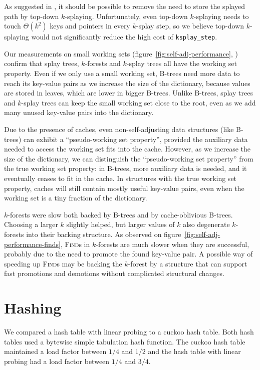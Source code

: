 As suggested in \cite{ksplay-sherk}, it should be possible to remove the
need to store the splayed path by top-down \mbox{$k$-splaying}.
Unfortunately, even top-down \mbox{$k$-splaying} needs to touch
$\Theta(k^2)$ keys and pointers in every $k$-splay step, so we believe top-down
\mbox{$k$-splaying} would not significantly reduce the high cost of
\texttt{ksplay\_step}.

Our measurements on small working sets
(figure~\ref{fig:self-adj-performance},
) confirm that splay trees, $k$-forests
and $k$-splay trees all have the working set property.
Even if we only use a small working set, B-trees need more data to reach
its key-value pairs as we increase the size of the dictionary, because values
are stored in leaves, which are lower in bigger B-trees.
Unlike B-trees, splay trees and $k$-splay trees can keep the small working set
close to the root, even as we add many unused key-value pairs into the
dictionary.

Due to the presence of caches, even non-self-adjusting data structures (like
\mbox{B-trees}) can exhibit a ``pseudo-working set property'', provided
the auxiliary data needed to access the working set fits into the cache.
However, as we increase the size of the dictionary, we can distinguish
the ``pseudo-working set property'' from the true working set property:
in B-trees, more auxiliary data is needed, and it eventually ceases to fit
in the cache.
In structures with the true working set property, caches will still contain
mostly useful key-value pairs, even when the working set is a tiny fraction
of the dictionary.

$k$-forests were slow both backed by B-trees and by cache-oblivious B-trees.
Choosing a larger $k$ slightly helped, but larger values of $k$ also degenerate
\mbox{$k$-forests} into their backing structure.
As observed on figure~\ref{fig:self-adj-performance-finds}, \textsc{Find}s in
$k$-forests are much slower when they are successful, probably due to the need
to promote the found key-value pair. A possible way of speeding up
\textsc{Find}s may be backing the \mbox{$k$-forest} by a structure that can
support fast promotions and demotions without complicated structural changes.

\section{Hashing}
\label{sec:hashing-results}
We compared a hash table with linear probing to a cuckoo hash table.
Both hash tables used a bytewise simple tabulation hash function.
The cuckoo hash table maintained a load factor between $1/4$ and
$1/2$ and the hash table with linear probing had a load factor
between $1/4$ and $3/4$.

